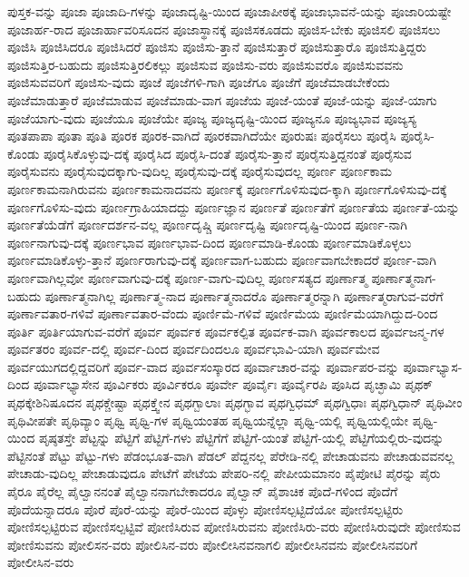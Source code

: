 {ಪುಸ್ತಕ-ವನ್ನು
ಪೂಜಾ
ಪೂಜಾದಿ-ಗಳನ್ನು
ಪೂಜಾದೃಷ್ಟಿ-ಯಿಂದ
ಪೂಜಾಪೀಠಕ್ಕೆ
ಪೂಜಾಭಾವನೆ-ಯನ್ನು
ಪೂಜಾರಿಯಷ್ಟೇ
ಪೂಜಾರ್ಹ-ರಾದ
ಪೂಜಾರ್ಹಾವರಿಸೂದನ
ಪೂಜಾಸ್ಥಾನಕ್ಕೆ
ಪೂಜಿಸಕೂಡದು
ಪೂಜಿಸ-ಬೇಕು
ಪೂಜಿಸಲಿ
ಪೂಜಿಸಲು
ಪೂಜಿಸಿ
ಪೂಜಿಸಿದರೂ
ಪೂಜಿಸಿದರೆ
ಪೂಜಿಸು
ಪೂಜಿಸು-ತ್ತಾನೆ
ಪೂಜಿಸುತ್ತಾರೆ
ಪೂಜಿಸುತ್ತಾರೊ
ಪೂಜಿಸುತ್ತಿದ್ದರು
ಪೂಜಿಸುತ್ತಿರ-ಬಹುದು
ಪೂಜಿಸುತ್ತಿರಲಿಕಲ್ಲು
ಪೂಜಿಸುವ
ಪೂಜಿಸು-ವರು
ಪೂಜಿಸುವರೊ
ಪೂಜಿಸುವವನು
ಪೂಜಿಸುವವರಿಗೆ
ಪೂಜಿಸು-ವುದು
ಪೂಜೆ
ಪೂಜೆಗಳಿ-ಗಾಗಿ
ಪೂಜೆಗೂ
ಪೂಜೆಗೆ
ಪೂಜೆಮಾಡಬೇಕೆಂದು
ಪೂಜೆಮಾಡುತ್ತಾರೆ
ಪೂಜೆಮಾಡುವ
ಪೂಜೆಮಾಡು-ವಾಗ
ಪೂಜೆಯ
ಪೂಜೆ-ಯಂತೆ
ಪೂಜೆ-ಯನ್ನು
ಪೂಜೆ-ಯಾಗು
ಪೂಜೆಯಾಗು-ವುದು
ಪೂಜೆಯೂ
ಪೂಜೆಯೇ
ಪೂಜ್ಯ
ಪೂಜ್ಯದೃಷ್ಟಿ-ಯಿಂದ
ಪೂಜ್ಯನೂ
ಪೂಜ್ಯಭಾವ
ಪೂಜ್ಯಸ್ಯ
ಪೂತಪಾಪಾ
ಪೂತಾ
ಪೂತಿ
ಪೂರಕ
ಪೂರಕ-ವಾಗಿದೆ
ಪೂರಕವಾಗಿದೆಯೇ
ಪೂರುಷಃ
ಪೂರೈಸಲು
ಪೂರೈಸಿ
ಪೂರೈಸಿ-ಕೊಂಡು
ಪೂರೈಸಿಕೊಳ್ಳುವು-ದಕ್ಕೆ
ಪೂರೈಸಿದ
ಪೂರೈಸಿ-ದಂತೆ
ಪೂರೈಸು-ತ್ತಾನೆ
ಪೂರೈಸುತ್ತಿದ್ದನಂತೆ
ಪೂರೈಸುವ
ಪೂರೈಸುವನು
ಪೂರೈಸುವುದಕ್ಕಾಗು-ವುದಿಲ್ಲ
ಪೂರೈಸುವು-ದಕ್ಕೆ
ಪೂರೈಸುವುದಲ್ಲ
ಪೂರ್ಣ
ಪೂರ್ಣಕಾಮ
ಪೂರ್ಣಕಾಮನಾಗಿರುವನು
ಪೂರ್ಣಕಾಮನಾದವನು
ಪೂರ್ಣಕ್ಕೆ
ಪೂರ್ಣಗೊಳಿಸುವುದ-ಕ್ಕಾಗಿ
ಪೂರ್ಣಗೊಳಿಸುವು-ದಕ್ಕೆ
ಪೂರ್ಣಗೊಳಿಸು-ವುದು
ಪೂರ್ಣಗ್ರಾಹಿಯಾದದ್ದು
ಪೂರ್ಣಜ್ಞಾನ
ಪೂರ್ಣತೆ
ಪೂರ್ಣತೆಗೆ
ಪೂರ್ಣತೆಯ
ಪೂರ್ಣತೆ-ಯನ್ನು
ಪೂರ್ಣತೆಯೆಡೆಗೆ
ಪೂರ್ಣದರ್ಶನ-ವಲ್ಲ
ಪೂರ್ಣದೃಷ್ಚಿ
ಪೂರ್ಣದೃಷ್ಟಿ
ಪೂರ್ಣದೃಷ್ಟಿ-ಯಿಂದ
ಪೂರ್ಣ-ನಾಗಿ
ಪೂರ್ಣನಾಗುವು-ದಕ್ಕೆ
ಪೂರ್ಣಭಾವ
ಪೂರ್ಣಭಾವ-ದಿಂದ
ಪೂರ್ಣಮಾಡಿ-ಕೊಂಡು
ಪೂರ್ಣಮಾಡಿಕೊಳ್ಳಲು
ಪೂರ್ಣಮಾಡಿಕೊಳ್ಳು-ತ್ತಾನೆ
ಪೂರ್ಣರಾಗುವು-ದಕ್ಕೆ
ಪೂರ್ಣವಾಗ-ಬಹುದು
ಪೂರ್ಣವಾಗಬೇಕಾದರೆ
ಪೂರ್ಣ-ವಾಗಿ
ಪೂರ್ಣವಾಗಿಲ್ಲವೋ
ಪೂರ್ಣವಾಗುವು-ದಕ್ಕೆ
ಪೂರ್ಣ-ವಾಗು-ವುದಿಲ್ಲ
ಪೂರ್ಣಸತ್ಯದ
ಪೂರ್ಣಾತ್ಮ
ಪೂರ್ಣಾತ್ಮನಾಗ-ಬಹುದು
ಪೂರ್ಣಾತ್ಮನಾಗಿಲ್ಲ
ಪೂರ್ಣಾತ್ಮ-ನಾದ
ಪೂರ್ಣಾತ್ಮನಾದರೊ
ಪೂರ್ಣಾತ್ಮರನ್ನಾಗಿ
ಪೂರ್ಣಾತ್ಮರಾಗುವ-ವರೆಗೆ
ಪೂರ್ಣಾವತಾರ-ಗಳಿವೆ
ಪೂರ್ಣಾವತಾರ-ವೆಂದು
ಪೂರ್ಣಿಮೆ-ಗಳಿವೆ
ಪೂರ್ಣಿಮೆಯ
ಪೂರ್ಣಿಮೆಯಾಗಿದ್ದುದ-ರಿಂದ
ಪೂರ್ತಿ
ಪೂರ್ತಿಯಾಗುವ-ವರೆಗೆ
ಪೂರ್ವ
ಪೂರ್ವಕ
ಪೂರ್ವಕಲ್ಪಿತ
ಪೂರ್ವಕ-ವಾಗಿ
ಪೂರ್ವಕಾಲದ
ಪೂರ್ವಜನ್ಮ-ಗಳ
ಪೂರ್ವತರಂ
ಪೂರ್ವ-ದಲ್ಲಿ
ಪೂರ್ವ-ದಿಂದ
ಪೂರ್ವದಿಂದಲೂ
ಪೂರ್ವಭಾವಿ-ಯಾಗಿ
ಪೂರ್ವಮೇವ
ಪೂರ್ವಯುಗದಲ್ಲಿದ್ದವರಿಗೆ
ಪೂರ್ವ-ವಾದ
ಪೂರ್ವಸಂಸ್ಕಾರದ
ಪೂರ್ವಾಚಾರ-ವನ್ನು
ಪೂರ್ವಾಪರ-ವನ್ನು
ಪೂರ್ವಾಭ್ಯಾಸ-ದಿಂದ
ಪೂರ್ವಾಭ್ಯಾಸೇನ
ಪೂರ್ವಿಕರು
ಪೂರ್ವಿಕರೂ
ಪೂರ್ವೇ
ಪೂರ್ವೈಃ
ಪೂರ್ವೈರಪಿ
ಪೂಸಿದ
ಪೃಚ್ಛಾಮಿ
ಪೃಥಕ್
ಪೃಥಕ್ಕೇಶಿನಿಷೂದನ
ಪೃಥಕ್ಚೇಷ್ಟಾ
ಪೃಥಕ್ತ್ವೇನ
ಪೃಥಗ್ಬಾಲಾಃ
ಪೃಥಗ್ಭಾವ
ಪೃಥಗ್ವಿಧಮ್
ಪೃಥಗ್ವಿಧಾಃ
ಪೃಥಗ್ವಿಧಾನ್
ಪೃಥಿವೀಂ
ಪೃಥಿವೀಪತೇ
ಪೃಥಿವ್ಯಾಂ
ಪೃಥ್ವಿ
ಪೃಥ್ವಿ-ಗಳ
ಪೃಥ್ವಿಯಂತಹ
ಪೃಥ್ವಿಯನ್ನೆಲ್ಲಾ
ಪೃಥ್ವಿ-ಯಲ್ಲಿ
ಪೃಥ್ವಿಯಲ್ಲಿಯೇ
ಪೃಥ್ವಿ-ಯಿಂದ
ಪೃಷ್ಠತಸ್ತೇ
ಪೆಟ್ಟನ್ನು
ಪೆಟ್ಟಿಗೆ
ಪೆಟ್ಟಿಗೆ-ಗಳು
ಪೆಟ್ಟಿಗೆಗೆ
ಪೆಟ್ಟಿಗೆ-ಯಂತೆ
ಪೆಟ್ಟಿಗೆ-ಯಲ್ಲಿ
ಪೆಟ್ಟಿಗೆಯಲ್ಲಿರು-ವುದನ್ನು
ಪೆಟ್ಟಿನಂತೆ
ಪೆಟ್ಟು
ಪೆಟ್ಟು-ಗಳು
ಪೆಡಂಭೂತ-ವಾಗಿ
ಪೆಡಲ್
ಪೆದ್ದನಲ್ಲ
ಪೆರೇಡಿ-ನಲ್ಲಿ
ಪೇಚಾಡುವನು
ಪೇಚಾಡುವವನಲ್ಲ
ಪೇಚಾಡು-ವುದಿಲ್ಲ
ಪೇಚಾಡುವುದೂ
ಪೇಟೆಗೆ
ಪೇಟೆಯ
ಪೇಪರಿ-ನಲ್ಲಿ
ಪೇಪೀಯಮಾನಂ
ಪೈಪೋಟಿ
ಪೈರನ್ನು
ಪೈರು
ಪೈರೂ
ಪೈರೆಲ್ಲ
ಪೈಲ್ವಾನನಂತೆ
ಪೈಲ್ವಾನನಾಗಬೇಕಾದರೂ
ಪೈಲ್ವಾನ್
ಪೈಶಾಚಿಕ
ಪೊದೆ-ಗಳಿಂದ
ಪೊದೆಗೆ
ಪೊದೆಯನ್ನಾದರೂ
ಪೊರೆ
ಪೊರೆ-ಯನ್ನು
ಪೊರೆ-ಯಿಂದ
ಪೊಳ್ಳು
ಪೋಣಿಸಲ್ಪಟ್ಟಿದೆಯೋ
ಪೋಣಿಸಲ್ಪಟ್ಟಿರು
ಪೋಣಿಸಲ್ಪಟ್ಟಿರುವ
ಪೋಣಿಸಲ್ಪಟ್ಟಿವೆ
ಪೋಣಿಸಿರುವ
ಪೋಣಿಸಿರುವನು
ಪೋಣಿಸಿರು-ವರು
ಪೋಣಿಸಿರುವುದೇ
ಪೋಣಿಸುವ
ಪೋಣಿಸುವನು
ಪೋಲಿಸನ-ವರು
ಪೋಲಿಸಿನ-ವರು
ಪೋಲೀಸಿನವನಾಗಲಿ
ಪೋಲೀಸಿನವನು
ಪೋಲೀಸಿನವರಿಗೆ
ಪೋಲೀಸಿನ-ವರು
}
